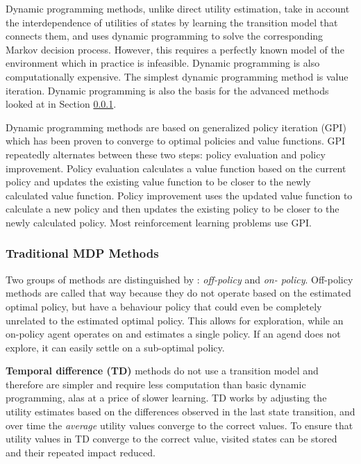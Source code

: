 Dynamic programming methods, unlike direct utility estimation, take in account
the interdependence of utilities of states by learning the transition model
that connects them, and uses dynamic programming to solve the corresponding
Markov decision process. However, this requires a perfectly known model of the
environment which in practice is infeasible. Dynamic programming is also
computationally expensive. The simplest dynamic programming method is value
iteration. Dynamic programming is also the basis for the advanced methods
looked at in Section \ref{sec:ai:mdp:methods}.
\parencite{Sutton1998ai+reinforcement}

Dynamic programming methods are based on generalized policy iteration (GPI)
which has been proven to converge to optimal policies and value functions. GPI
repeatedly alternates between these two steps: policy evaluation and policy
improvement. Policy evaluation calculates a value function based on the current
policy and updates the existing value function to be closer to the newly
calculated value function. Policy improvement uses the updated value function
to calculate a new policy and then updates the existing policy to be closer to
the newly calculated policy. Most reinforcement learning problems use GPI.
\parencite{Sutton1998ai+reinforcement}


\subsubsection{Traditional MDP Methods}
\label{sec:ai:mdp:methods}

Two groups of methods are distinguished by
\textcite{Sutton1998ai+reinforcement}: \textit{off-policy} and \textit{on-
policy}. Off-policy methods are called that way because they do not operate
based on the estimated optimal policy, but have a behaviour policy that could
even be completely unrelated to the estimated optimal policy. This allows for
exploration, while an on-policy agent operates on and estimates a single
policy. If an agend does not explore, it can easily settle on a sub-optimal
policy.

\textbf{Temporal difference (TD)} methods do not use a transition model and
therefore are simpler and require less computation than basic dynamic
programming, alas at a price of slower learning. TD works by adjusting the
utility estimates based on the differences observed in the last state
transition, and over time the \textit{average} utility values converge to the
correct values. To ensure that utility values in TD converge to the correct
value, visited states can be stored and their repeated impact reduced.
\parencite{Russell2010ai+modern}

